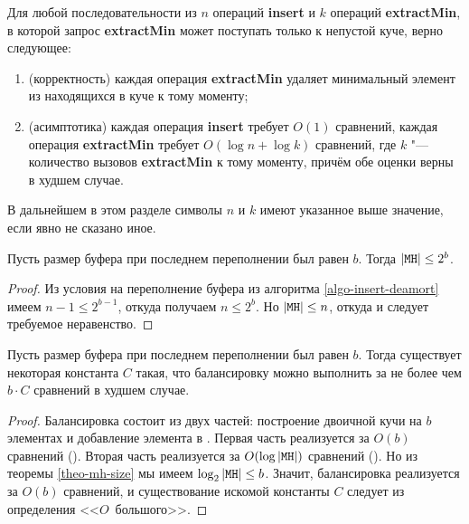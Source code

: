 \begin{theorem} \label{theo-fast-correct}
Для любой последовательности из
$n$ операций \textbf{insert} и $k$ операций \textbf{extractMin},
в которой запрос \textbf{extractMin} может поступать только к непустой
куче, верно следующее:
\begin{enumerate}
\item (корректность) каждая операция \textbf{extractMin} удаляет минимальный элемент
из находящихся в куче к тому моменту;
\item (асимптотика) каждая операция \textbf{insert} требует $O(1)$ сравнений,
каждая операция \textbf{extractMin} требует $O(\log n + \log k)$ сравнений,
где $k$ "--- количество вызовов \textbf{extractMin} к тому моменту, причём
обе оценки верны в худшем случае.
\end{enumerate}
\end{theorem}

\bigskip

В дальнейшем в этом разделе символы $n$ и $k$ имеют указанное выше значение,
если явно не сказано иное.

\begin{lem} \label{theo-mh-size}
Пусть размер буфера при последнем переполнении был равен $b$. Тогда $|\MH| \leq 2^b$.
\end{lem}
\begin{proof}
Из условия на переполнение буфера из алгоритма \ref{algo-insert-deamort} имеем
$n-1 \leq 2^{b-1}$, откуда получаем $n \leq 2^b$. Но $|\MH| \leq n$, откуда
и следует требуемое неравенство.
\end{proof}

\begin{lem}\label{theo-balancing-constant}
Пусть размер буфера при последнем переполнении был равен $b$.
Тогда существует некоторая константа $C$ такая,
что балансировку можно выполнить за не более чем $b\cdot C$ сравнений в худшем случае.
\end{lem}
\begin{proof}
Балансировка состоит из двух частей: построение двоичной кучи на $b$ элементах
и добавление элемента в \MH. Первая часть реализуется за $O(b)$ сравнений
(\cite[с.~181]{Cormen}).
Вторая часть реализуется за $O(\log |\MH|)$ сравнений (\cite[с.~181]{Cormen}). Но из
теоремы \ref{theo-mh-size} мы имеем $\log_2 |\MH| \leq b$. Значит, балансировка
реализуется за $O(b)$ сравнений, и существование искомой константы $C$ следует
из определения <<$O$~большого>>.
\end{proof}

